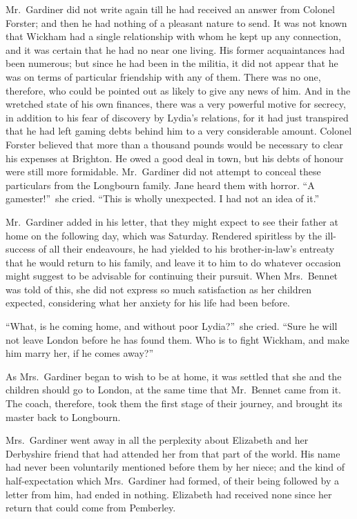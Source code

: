 \documentclass[12pt,english]{book}
\begin{document}
Mr.\ Gardiner did not write again till he had received an answer
from Colonel Forster; and then he had nothing of a pleasant nature
to send. It was not known that Wickham had a single relationship with
whom he kept up any connection, and it was certain that he had no
near one living. His former acquaintances had been numerous; but since
he had been in the militia, it did not appear that he was on terms
of particular friendship with any of them. There was no one, therefore,
who could be pointed out as likely to give any news of him. And in
the wretched state of his own finances, there was a very powerful
motive for secrecy, in addition to his fear of discovery by Lydia's
relations, for it had just transpired that he had left gaming debts
behind him to a very considerable amount. Colonel Forster believed
that more than a thousand pounds would be necessary to clear his expenses
at Brighton. He owed a good deal in town, but his debts of honour
were still more formidable. Mr.\ Gardiner did not attempt to conceal
these particulars from the Longbourn family. Jane heard them with
horror. {}``A gamester!''\ she cried. {}``This is wholly unexpected.
I had not an idea of it.''

Mr.\ Gardiner added in his letter, that they might expect to see
their father at home on the following day, which was Saturday. Rendered
spiritless by the ill-success of all their endeavours, he had yielded
to his brother-in-law's entreaty that he would return to his family,
and leave it to him to do whatever occasion might suggest to be advisable
for continuing their pursuit. When Mrs.\ Bennet was told of this,
she did not express so much satisfaction as her children expected,
considering what her anxiety for his life had been before.

{}``What, is he coming home, and without poor Lydia?''\ she cried.
{}``Sure he will not leave London before he has found them. Who is
to fight Wickham, and make him marry her, if he comes away?''\ 

As Mrs.\ Gardiner began to wish to be at home, it was settled that
she and the children should go to London, at the same time that Mr.\ Bennet
came from it. The coach, therefore, took them the first stage of their
journey, and brought its master back to Longbourn.

Mrs.\ Gardiner went away in all the perplexity about Elizabeth and
her Derbyshire friend that had attended her from that part of the
world. His name had never been voluntarily mentioned before them by
her niece; and the kind of half-expectation which Mrs.\ Gardiner
had formed, of their being followed by a letter from him, had ended
in nothing. Elizabeth had received none since her return that could
come from Pemberley.
\end{document}

